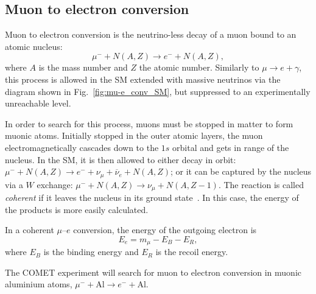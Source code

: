 \subsection{Muon to electron conversion}
Muon to electron conversion is the neutrino-less decay of a muon bound to an
atomic nucleus:
$$
\mu^- + N(A, Z) \rightarrow e^- + N(A, Z),
$$
where $A$ is the mass number and $Z$ the atomic number.
Similarly to $\mu\rightarrow e+\gamma$, this process is allowed in the SM
extended with massive neutrinos via the diagram shown in
Fig.~\ref{fig:mu-e_conv_SM}, but suppressed to an experimentally
unreachable level.

In order to search for this process, muons must be stopped in matter to form
muonic atoms. Initially stopped in the outer atomic layers, the muon electromagnetically
cascades down to the $1s$ orbital and gets in range of the nucleus. In the SM,
it is then allowed to either decay in orbit: ${\mu^- + N(A, Z) \rightarrow e^- + \nu_\mu +
\overline{\nu}_e + N(A, Z)}$; or it can be captured by the nucleus via a $W$ exchange: ${\mu^- +
N(A, Z) \rightarrow \nu_\mu + N(A, Z-1)}$. 
The reaction is called \emph{coherent} if it leaves the nucleus in its ground
state~\cite{CHIANG1993526}. In this case, the energy of the products is more
easily calculated.

In a coherent $\mu$--$e$ conversion, the energy of the outgoing electron is
$$
E_e = m_\mu - E_B - E_R,
$$
where $E_B$ is the binding energy and $E_R$ is the recoil energy.







The COMET experiment will search for muon to electron conversion in muonic
aluminium atoms, $\mu^- + \mathrm{Al} \rightarrow e^- + \mathrm{Al}$.









